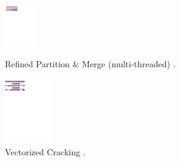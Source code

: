 \begin{figure}[!t]
\begin{center}
\includegraphics[trim=-0.5cm 25.7cm 0.5cm 1cm,width=2\columnwidth, height=1.8cm]{Figures/holistic/mcrack2}
\vspace{-0.25 in}
\caption{Refined Partition \& Merge (multi-threaded) \cite{efficient_cracking}.}
\vspace{-0.7cm}
\label{fig:mt-cracking}
\end{center}
\end{figure}

\begin{figure}[!t]
\begin{center}
\includegraphics[trim=0cm 24.5cm 0cm 1cm,width=2.3\columnwidth,height=2.8cm]{Figures/holistic/vectorized}
\caption{Vectorized Cracking \cite{efficient_cracking}.}
\label{fig:vectorized-cracking}
\vspace{-0.7cm}
\end{center}
\end{figure}

